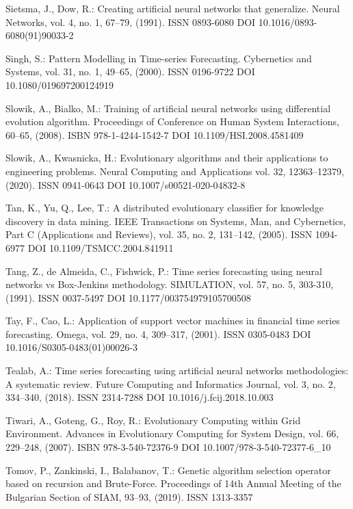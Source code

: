 \begin{thebibliography}{99.}
 Sietsma, J., Dow, R.: Creating artificial neural networks that generalize. Neural Networks, vol. 4, no. 1, 67--79, (1991). ISSN 0893-6080 DOI 10.1016/0893-6080(91)90033-2

 Singh, S.: Pattern Modelling in Time-series Forecasting. Cybernetics and Systems, vol. 31, no. 1, 49--65, (2000). ISSN 0196-9722 DOI 10.1080/019697200124919

 Slowik, A., Bialko, M.: Training of artificial neural networks using differential evolution algorithm. Proceedings of Conference on Human System Interactions, 60--65, (2008). ISBN 978-1-4244-1542-7 DOI 10.1109/HSI.2008.4581409

 Slowik, A., Kwasnicka, H.: Evolutionary algorithms and their applications to engineering problems. Neural Computing and Applications vol. 32, 12363--12379, (2020). ISSN 0941-0643 DOI 10.1007/s00521-020-04832-8

 Tan, K., Yu, Q., Lee, T.: A distributed evolutionary classifier for knowledge discovery in data mining. IEEE Transactions on Systems, Man, and Cybernetics, Part C (Applications and Reviews), vol. 35, no. 2, 131--142, (2005). ISSN 1094-6977 DOI 10.1109/TSMCC.2004.841911

 Tang, Z., de Almeida, C., Fishwick, P.: Time series forecasting using neural networks vs Box-Jenkins methodology. SIMULATION, vol. 57, no. 5, 303-310, (1991). ISSN 0037-5497 DOI 10.1177/003754979105700508

 Tay, F., Cao, L.: Application of support vector machines in financial time series forecasting. Omega, vol. 29, no. 4, 309--317, (2001). ISSN 0305-0483 DOI 10.1016/S0305-0483(01)00026-3

 Tealab, A.: Time series forecasting using artificial neural networks methodologies: A systematic review. Future Computing and Informatics Journal, vol. 3, no. 2, 334--340, (2018). ISSN 2314-7288 DOI 10.1016/j.fcij.2018.10.003

 Tiwari, A., Goteng, G., Roy, R.: Evolutionary Computing within Grid Environment. Advances in Evolutionary Computing for System Design, vol. 66, 229--248, (2007). ISBN 978-3-540-72376-9 DOI 10.1007/978-3-540-72377-6\_10

 Tomov, P., Zankinski, I., Balabanov, T.: Genetic algorithm selection operator based on recursion and Brute-Force. Proceedings of 14th Annual Meeting of the Bulgarian Section of SIAM, 93--93, (2019). ISSN 1313-3357


\end{thebibliography}
